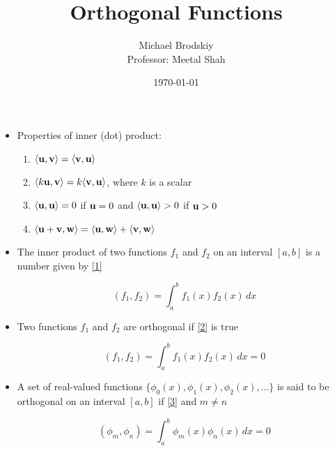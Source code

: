 \documentclass[12pt]{article}
\title{Orthogonal Functions}
\date{\today}
\author{Michael Brodskiy\\ \small Professor: Meetal Shah}
\begin{document}
\maketitle

\begin{itemize}

  \item Properties of inner (dot) product:

    \begin{enumerate}

      \item $\langle \bold{u}, \bold{v}\rangle=\langle \bold{v}, \bold{u}\rangle$

      \item $\langle k\bold{u}, \bold{v}\rangle=k\langle \bold{v}, \bold{u}\rangle$, where $k$ is a scalar

      \item $\langle \bold{u}, \bold{u}\rangle=0$ if $\bold{u}=0$ and $\langle \bold{u}, \bold{u}\rangle >0$ if $\bold{u}>0$

      \item $\langle \bold{u}+\bold{v}, \bold{w}\rangle=\langle \bold{u},\bold{w}\rangle+\langle \bold{v},\bold{w}\rangle$

    \end{enumerate}

  \item The inner product of two functions $f_1$ and $f_2$ on an interval $[a,b]$ is a number given by \eqref{1}

    \begin{equation}
      (f_1,f_2)=\int_a^b f_1(x)f_2(x)\,dx
      \label{1}
    \end{equation}

  \item Two functions $f_1$ and $f_2$ are orthogonal if \eqref{2} is true

    \begin{equation}
      (f_1,f_2)=\int_a^b f_1(x)f_2(x)\,dx=0
      \label{2}
    \end{equation}

  \item A set of real-valued functions $\{\phi_0(x),\phi_1(x),\phi_2(x),\dots\}$ is said to be orthogonal on an interval $[a,b]$ if \eqref{3} and $m\neq n$

    \begin{equation}
      (\phi_m,\phi_n)=\int_a^b \phi_m(x)\phi_n(x)\,dx=0
      \label{3}
    \end{equation}


\end{itemize}
\end{document}
